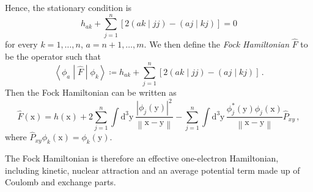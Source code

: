 \documentclass{article}
\theoremstyle{plain}\theoremheaderfont{\normalfont\itshape}\theorembodyfont{\rmfamily}\theoremseparator{.}\newtheorem*{rem}{Remark}\newtheorem*{ex}{Example}\newtheorem*{proof}{Proof}\newtheorem*{altp}{Alternative proof}
\theoremstyle{plain}\theoremheaderfont{\normalfont\bfseries}\theorembodyfont{\rmfamily}\theoremseparator{.}\newtheorem{thm}{Theorem}[section]\newtheorem{lem}[thm]{Lemma}\newtheorem{prop}[thm]{Proposition}\newtheorem*{cor}{Corollary}\newtheorem{defn}[thm]{Definition}\newtheorem{clm}[thm]{Claim}\newtheorem{clminproof}{Claim}
\theoremstyle{break}\theoremheaderfont{\normalfont\itshape}\theorembodyfont{\rmfamily}\theoremseparator{.\medskip}\newtheorem*{proofskip}{Proof}\newtheorem*{exs}{Examples}\newtheorem*{rems}{Remarks}
\theoremstyle{break}\theoremheaderfont{\normalfont\bfseries}\theorembodyfont{\rmfamily}\theoremseparator{.\medskip}\newtheorem{lemskip}[thm]{Lemma}\newtheorem{defnskip}[thm]{Definition}\newtheorem{propskip}[thm]{Proposition}\newtheorem{thmskip}[thm]{Theorem}
\numberwithin{equation}{section}
\newcommand{\dd}[2][]{\mathrm{d}^{#1} #2\,}
\newcommand{\mel}[3]{\left\langle #1 \middle| #2 \middle| #3 \right\rangle}
\newcommand{\vb}[1]{\bm{\mathrm{#1}}}
\newcommand{\abs}[1]{\left| #1 \right|}
\newcommand{\norm}[1]{\left\| #1 \right\|}
\newcommand{\bracket}[2]{\left( #1 \middle| #2 \right)}
\begin{document}
    Hence, the stationary condition is
    \begin{equation}\label{closed_shell_SCF_stationary}
        h_{ak}+\sum_{j=1}^{n}[2\bracket{ak}{jj}-\bracket{aj}{kj}]=0
    \end{equation}
    for every \(k=1,\dots,n\), \(a=n+1,\dots, m\). We then define the \textit{Fock Hamiltonian} \(\hat{F}\) to be the operator such that
    \begin{equation}\label{Fock_Hamiltonian}
        \mel{\phi_a}{\hat{F}}{\phi_k}\coloneqq h_{ak}+\sum_{j=1}^{n}[2\bracket{ak}{jj}-\bracket{aj}{kj}]\,.
    \end{equation}
    Then the Fock Hamiltonian can be written as
    \begin{equation}
        \hat{F}(\vb{x})=\hat{h}(\vb{x})+2\sum_{j=1}^{n}\int\dd[3]{\vb{y}}\frac{\abs{\phi_j(\vb{y})}^2}{\norm{\vb{x}-\vb{y}}}-\sum_{j=1}^{n}\int\dd[3]{\vb{y}}\frac{\phi_j^*(\vb{y})\phi_j(\vb{x})}{\norm{\vb{x}-\vb{y}}}\hat{P}_{xy}\,,
    \end{equation}
    where \(\hat{P}_{xy}\phi_k(\vb{x})=\phi_k(\vb{y})\).

    The Fock Hamiltonian is therefore an effective one-electron Hamiltonian, including kinetic, nuclear attraction and an average potential term made up of Coulomb and exchange parts.
\end{document}
